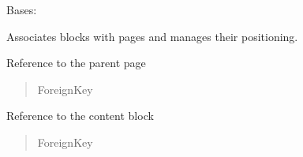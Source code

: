 \documentclass[letterpaper,10pt,english]{sphinxmanual}
\begin{document}
\begin{fulllineitems}
\label{\detokenize{pages_app.models:pages_app.models.PageBlock}}
\pysigstartsignatures
\pysiglinewithargsret
{}
{\sphinxparamcomma {}}
{}
\pysigstopsignatures
\sphinxAtStartPar
Bases: 

\sphinxAtStartPar
Associates blocks with pages and manages their positioning.

\begin{fulllineitems}
\label{\detokenize{pages_app.models:pages_app.models.PageBlock.page}}
\pysigstartsignatures
\pysigline
{}
\pysigstopsignatures
\sphinxAtStartPar
Reference to the parent page
\begin{quote}\begin{description}
\sphinxAtStartPar
ForeignKey

\end{description}\end{quote}

\end{fulllineitems}


\begin{fulllineitems}
\label{\detokenize{pages_app.models:pages_app.models.PageBlock.block}}
\pysigstartsignatures
\pysigline
{}
\pysigstopsignatures
\sphinxAtStartPar
Reference to the content block
\begin{quote}\begin{description}
\sphinxAtStartPar
ForeignKey

\end{description}\end{quote}

\end{fulllineitems}



\end{fulllineitems}
\end{document}
